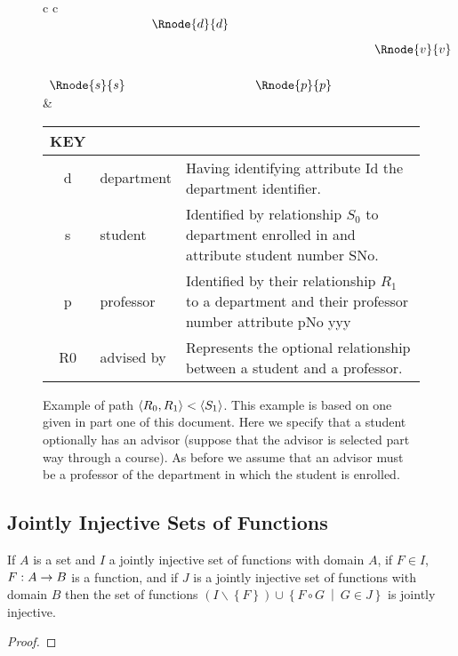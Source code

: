 \documentclass[10pt,a4paper]{article}
\newcommand{\setsuchthat}[2]{\left\{#1 \ \middle|\ #2\right\}}
\newcommand{\set}[1]{\left\{#1\right\}}
\begin{document}
\begin{figure} [h]  %
\begin{center}
\begin{tabular}{c c}
$
\begin{array}{cp{0.05cm}c  p{0.05cm}c p{0.5cm}c}
                & & \Rnode{d}{d} & &              & &             \\ [0.3cm]
								& &              & &              & & \Rnode{v}{v} \\ [0.6cm]     
	 \Rnode{s}{s} & &              & & \Rnode{p}{p} & &             
\end{array}
$
\idcomp
{} 
\idcomp
{} 
\idcomp
{} 
\idcomp
{} 
\idcomp
& \footnotesize
\begin{tabular}{c p{1.5cm} p{4cm}}
KEY && \\
\hline
d & department & Having identifying attribute Id the department identifier. \\
s & student & Identified by relationship $S_0$ to department enrolled in and  attribute student number SNo. \\
p & professor & Identified by their relationship $R_1$ to a department and their professor number attribute pNo yyy \\
R0 & advised by & Represents the optional relationship between a student and a professor.\\
\end{tabular} 
\end{tabular}
\end{center}
\caption{Example of path  $\langle R_0,R_1\rangle < \langle S_1\rangle$. This example is based on one given in part one of this document. Here we specify that a student optionally has an advisor (suppose that the advisor is selected part way through a course). As before we assume that an advisor must be a professor of the department in which the student is enrolled. }
\label{studentadvisorgraph}
\end{figure}

\subsection{Jointly Injective Sets of Functions}
\begin{lemma}
\label{jointlyinjectivecomposition}
If $A$ is a set and $I$  a jointly injective set of functions with domain $A$, if $F \in I$, $F: A \rightarrow B$ is a function,
and if $J$ is a jointly injective set of functions with domain $B$ then the set of functions
$(I \backslash \set{F}) \cup \setsuchthat{F \circ G}{G \in J}$ is jointly injective.
\end{lemma}
\begin{proof}

\end{proof}
\end{document}
